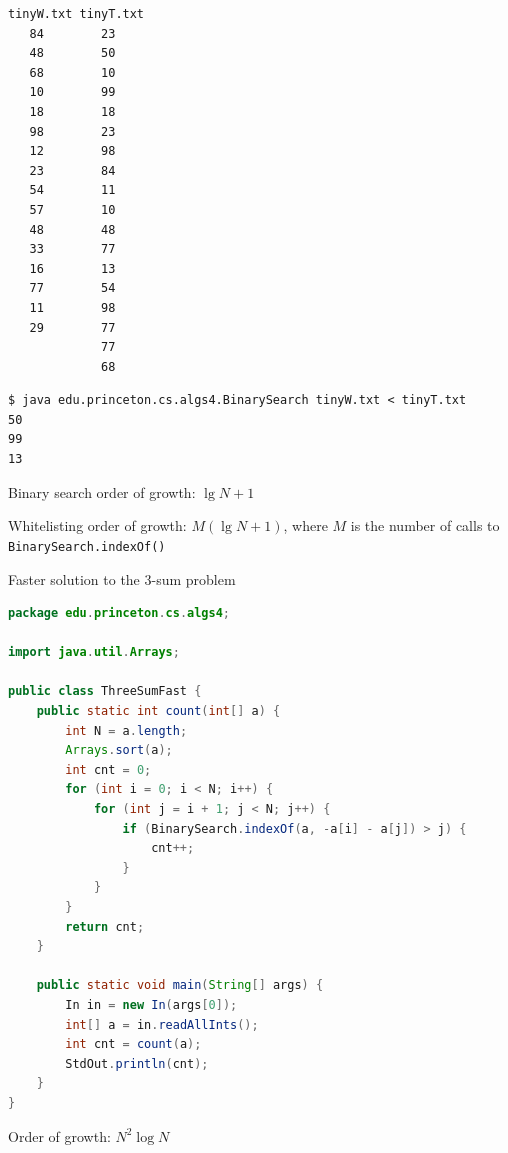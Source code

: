 \documentclass[8pt,a4paper,compress]{beamer}
\begin{document}
\begin{frame}[fragile]
\begin{lstlisting}[language={}]
tinyW.txt tinyT.txt
   84        23
   48        50
   68        10
   10        99
   18        18
   98        23
   12        98
   23        84
   54        11
   57        10
   48        48
   33        77
   16        13
   77        54
   11        98
   29        77
             77
             68
\end{lstlisting}

\begin{lstlisting}[language={}]
$ java edu.princeton.cs.algs4.BinarySearch tinyW.txt < tinyT.txt
50
99
13
\end{lstlisting}

Binary search order of growth: $\lg N + 1$ 

\bigskip

Whitelisting order of growth: $M(\lg N + 1)$, where $M$ is the number of calls to \lstinline{BinarySearch.indexOf()}
\end{frame}

\begin{frame}[fragile]
Faster solution to the 3-sum problem
\begin{lstlisting}[language=Java]
package edu.princeton.cs.algs4;

import java.util.Arrays;

public class ThreeSumFast {
    public static int count(int[] a) {
        int N = a.length;
        Arrays.sort(a);
        int cnt = 0;
        for (int i = 0; i < N; i++) {
            for (int j = i + 1; j < N; j++) {
                if (BinarySearch.indexOf(a, -a[i] - a[j]) > j) {
                    cnt++;
                }
            }
        }
        return cnt;
    }
    
    public static void main(String[] args) {
        In in = new In(args[0]);
        int[] a = in.readAllInts();
        int cnt = count(a);
        StdOut.println(cnt);
    }
}
\end{lstlisting}

Order of growth: $N^2\log N$
\end{frame}
\end{document}
